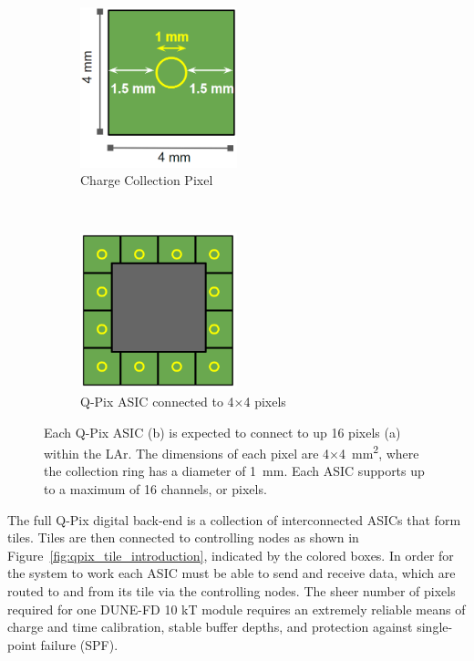 \begin{figure}[t!]
\centering
\begin{subfigure}[t]{.5\textwidth}
  \centering
  \includegraphics[width=0.5\textwidth]{images/single_pixel_dimensions_qpix.png}
  \caption{Charge Collection Pixel}
\end{subfigure}%
~
\begin{subfigure}[t]{.5\textwidth}
  \centering
  \includegraphics[width=0.5\textwidth]{images/single_asic_dimensions_qpix.png}
  \caption{Q-Pix ASIC connected to 4$\times$4 pixels}
\end{subfigure}
\caption{Each Q-Pix ASIC (b) is expected to connect to up 16 pixels (a) within the LAr.
The dimensions of each pixel are 4$\times$4~\unit{mm^2}, where the collection ring has a diameter of 1~\unit{mm}.
Each ASIC supports up to a maximum of 16 channels, or pixels.
}
\label{fig:qpix_asic_introduction}
\end{figure}

The full Q-Pix digital back-end is a collection of interconnected ASICs that form tiles.
Tiles are then connected to controlling nodes as shown in Figure~\ref{fig:qpix_tile_introduction}, indicated by the colored boxes.
In order for the system to work each ASIC must be able to send and receive data, which are routed to and from its tile via the controlling nodes.
The sheer number of pixels required for one DUNE-FD 10 kT module requires an extremely reliable means of charge and time calibration, stable buffer depths, and protection against single-point failure (SPF).

